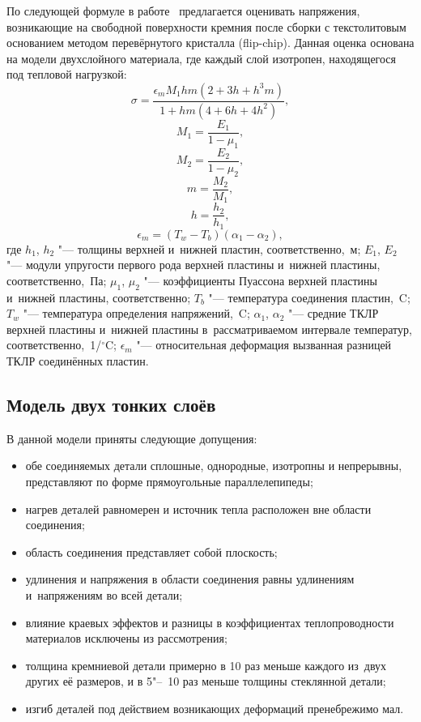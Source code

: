 По следующей формуле в работе~\cite{li2007stress} предлагается оценивать
напряжения, возникающие на свободной поверхности кремния после сборки с
текстолитовым основанием методом перевёрнутого кристалла (flip\nb-chip).
Данная оценка основана на модели двухслойного материала, где каждый слой
изотропен, находящегося под тепловой нагрузкой:
\[
\sigma = \frac{\epsilon_{m} M_1 h m (2 + 3 h + h^3 m) }{1 + h m (4 + 6 h + 4 h^2 )},
\]
\[
M_1=\frac{E_1}{1-\mu_1},
\]
\[
M_2=\frac{E_2}{1-\mu_2},
\]
\[
m = \frac{M_2}{M_1},
\]
\[
h = \frac{h_2}{h_1},
\]
\[
\epsilon_{m} = (T_{w} - T_{b})(\alpha_{1} - \alpha_{2}),
\]
где $h_1$, $h_2$ "--- толщины верхней и~нижней пластин, соответственно,~м;
$E_1$, $E_2$ "--- модули упругости первого рода верхней пластины и~нижней пластины, соответственно,~Па;
$\mu_1$, $\mu_2$ "--- коэффициенты Пуассона верхней пластины и~нижней пластины, соответственно;
$T_{b}$ "--- температура соединения пластин,~{\textdegree}C;
$T_{w}$ "--- температура определения напряжений,~{\textdegree}C;
$\alpha_{1}$, $\alpha_{2}$ "--- средние ТКЛР верхней пластины и~нижней пластины в~рассматриваемом интервале температур, соответственно,~1/${}^\circ$C;
$\epsilon_{m}$ "--- относительная деформация вызванная разницей ТКЛР соединённых пластин.

\subsection{Модель двух тонких слоёв}

В данной модели приняты следующие допущения:
\begin{itemize}
    \item обе соединяемых детали сплошные, однородные,
    изотропны и непрерывны, представляют по форме прямоугольные
    параллелепипеды;
    \item нагрев деталей равномерен и источник тепла расположен
    вне области соединения;
    \item область соединения представляет собой плоскость;
    \item удлинения и напряжения в области соединения равны удлинениям
    и~напряжениям во всей детали;
    \item влияние краевых эффектов и разницы в коэффициентах теплопроводности материалов
    исключены из рассмотрения;
    \item толщина кремниевой детали примерно в 10 раз меньше каждого
    из~двух других её размеров, и в 5"--~10 раз меньше толщины стеклянной детали;
    \item изгиб деталей под действием возникающих деформаций пренебрежимо
    мал.
\end{itemize}

